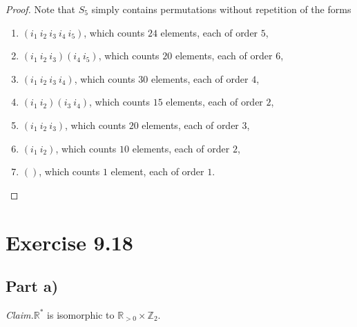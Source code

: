 \documentclass{abrice}
\newcommand{\Z}{\mathbb{Z}}
\newcommand{\R}{\mathbb{R}}
\newcommand{\Claim}{\noindent\emph{Claim.}\xspace}%
\begin{document}
\begin{proof}
  Note that $S_5$ simply contains permutations without repetition of the forms
  \begin{enumerate}[label=\emph{\roman*})]
  \item $(i_1\ i_2\ i_3\ i_4\ i_5)$, which counts $24$ elements, each of order $5$,
  \item $(i_1\ i_2\ i_3)(i_4\ i_5)$, which counts $20$ elements, each of order $6$,
  \item $(i_1\ i_2\ i_3\ i_4)$, which counts $30$ elements, each of order $4$,
  \item $(i_1\ i_2)(i_3\ i_4)$, which counts $15$ elements, each of order $2$,
  \item $(i_1\ i_2\ i_3)$, which counts $20$ elements, each of order $3$,
  \item $(i_1\ i_2)$, which counts $10$ elements, each of order $2$,
  \item $()$, which counts $1$ element, each of order $1$. \qedhere
  \end{enumerate}
\end{proof}

\section{Exercise 9.18}

\subsection{Part a)}

\Claim $\R^*$ is isomorphic to $\R_{>0} \times \Z_2$.
\end{document}
